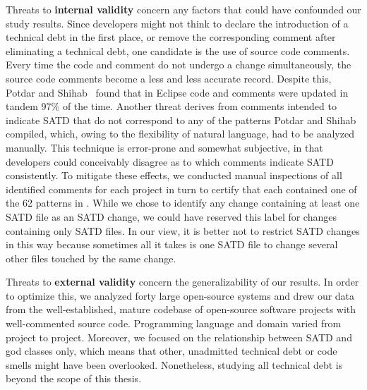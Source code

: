 Threats to \textbf{internal validity} concern any factors that could have confounded our study results. Since developers might not think to declare the introduction of a technical debt in the first place, or remove the corresponding comment after eliminating a technical debt, one candidate is the use of source code comments. Every time the code and comment do not undergo a change simultaneously, the source code comments become a less and less accurate record. Despite this, Potdar and Shihab~\cite{ICSM_PotdarS14} found that in Eclipse code and comments were updated in tandem 97\% of the time. Another threat derives from comments intended to indicate SATD that do not correspond to any of the patterns Potdar and Shihab~\cite{ICSM_PotdarS14} compiled, which, owing to the flexibility of natural language, had to be analyzed manually. This technique is error-prone and somewhat subjective, in that developers could conceivably disagree as to which comments indicate SATD consistently. To mitigate these effects, we conducted manual inspections of all identified comments for each project in turn to certify that each contained one of the 62 patterns in \cite{ICSM_PotdarS14}. While we chose to identify any change containing at least one SATD file as an SATD change, we could have reserved this label for changes containing only SATD files. In our view, it is better not to restrict SATD changes in this way because sometimes all it takes is one SATD file to change several other files touched by the same change.


Threats to \textbf{external validity} concern the generalizability of our results. In order to optimize this, we analyzed forty large open-source systems and drew our data from the well-established, mature codebase of open-source software projects with well-commented source code. Programming language and domain varied from project to project. Moreover, we focused on the relationship between SATD and god classes only, which means that other, unadmitted technical debt or code smells might have been overlooked. Nonetheless, studying all technical debt is beyond the scope of this thesis.








